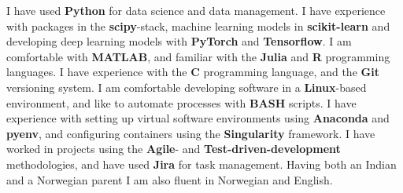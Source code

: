 
\begin{cvRelevantSkills}
I have used \textbf{Python} for data science and data management. I have experience with packages in the \textbf{scipy}-stack, machine learning models in \textbf{scikit-learn} and developing deep learning models with \textbf{PyTorch} and \textbf{Tensorflow}. I am comfortable with \textbf{MATLAB}, and familiar with the \textbf{Julia} and \textbf{R} programming languages.
\newline
\newline
I have experience with the \textbf{C} programming language, and the \textbf{Git} versioning system. I am comfortable developing software in a \textbf{Linux}-based environment, and like to automate processes with \textbf{BASH} scripts. I have experience with setting up virtual software environments using \textbf{Anaconda} and \textbf{pyenv}, and configuring containers using the \textbf{Singularity} framework. I have worked in projects using the \textbf{Agile}- and \textbf{Test-driven-development} methodologies, and have used \textbf{Jira} for task management. Having both an Indian and a Norwegian parent I am also fluent in Norwegian and English. 
\end{cvRelevantSkills}

